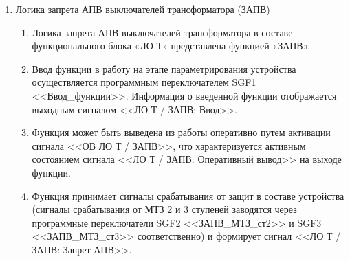 \begin{enumerate}
\begin{enumerate}
\item
Логика отключения в составе функционального блока «ЛО Т» представлена функцией «ЛО».

\item
Ввод функции в работу на этапе параметрирования устройства осуществляется программным переключателем SGF1 <<Ввод\_функции>>. Информация о введенной функции отображается выходным сигналом <<ЛО Т / ЛО: Ввод>>.
\item
Функция может быть выведена из работы оперативно путем активации сигнала <<ОВ ЛО Т / ЛО>>, что характеризуется активным состоянием сигнала <<ЛО Т / ЛО: Оперативный вывод>> на выходе функции.
\item
При появлении сигналов срабатывания от защитных функций в составе устройства функция формирует сигнал <<ЛО Т / ЛО: Срабатывание>>.

\FloatBarrier %

\end{enumerate}


\item Логика запрета АПВ выключателей трансформатора (ЗАПВ)
\begin{enumerate}

\item
Логика запрета АПВ выключателей трансформатора в составе функционального блока «ЛО Т» представлена функцией «ЗАПВ».

\item
Ввод функции в работу на этапе параметрирования устройства  осуществляется программным переключателем SGF1 <<Ввод\_функции>>. Информация о введенной функции отображается выходным сигналом <<ЛО Т / ЗАПВ: Ввод>>.
\item
Функция может быть выведена из работы оперативно путем активации сигнала <<ОВ ЛО Т / ЗАПВ>>, что характеризуется активным состоянием сигнала <<ЛО Т / ЗАПВ: Оперативный вывод>> на выходе функции.
\item
Функция принимает сигналы срабатывания от защит в составе устройства (сигналы срабатывания от МТЗ 2 и 3 ступеней заводятся через программные переключатели SGF2 <<ЗАПВ\_МТЗ\_ст2>> и SGF3 <<ЗАПВ\_МТЗ\_ст3>> соответственно) и формирует сигнал <<ЛО Т / ЗАПВ: Запрет АПВ>>.


\end{enumerate}
\end{enumerate}
